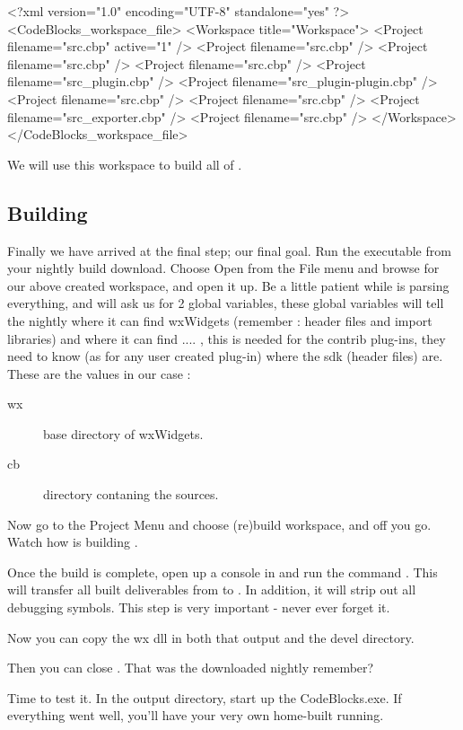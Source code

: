 \begin{code}
<?xml version="1.0" encoding="UTF-8" standalone="yes" ?>
<CodeBlocks_workspace_file>
 <Workspace title="Workspace">
   <Project filename="src\CodeBlocks.cbp" active="1" />
   <Project filename="src\plugins\contrib\codestat\codestat.cbp" />
   <Project filename="src\plugins\contrib\copystrings\copystrings.cbp" />
   <Project filename="src\plugins\contrib\dragscroll\dragscroll.cbp" />
   <Project filename="src\plugins\contrib\devpak_plugin\DevPakPlugin.cbp" />
   <Project filename="src\plugins\contrib\help_plugin\help-plugin.cbp" />
   <Project filename="src\plugins\contrib\keybinder\keybinder.cbp" />
   <Project filename="src\plugins\contrib\profiler\cbprofiler.cbp" />
   <Project filename="src\plugins\contrib\source_exporter\Exporter.cbp" />
   <Project filename="src\plugins\contrib\wxSmith\wxSmith.cbp" />
 </Workspace>
</CodeBlocks_workspace_file>
\end{code}

We will use this workspace to build all of \codeblocks.

\subsection{Building \codeblocks}

Finally we have arrived at the final step; our final goal. Run the \codeblocks executable from your nightly build download. Choose Open from the File menu and browse for our above created workspace, and open it up. Be a little patient while \codeblocks is parsing everything, and \codeblocks will ask us for 2 global variables, these global variables will tell the nightly \codeblocks where it can find wxWidgets (remember : header files and import libraries) and where it can find .... \codeblocks, this is needed for the contrib plug-ins, they need to know (as for any user created plug-in) where the sdk (\codeblocks header files) are. These are the values in our case :

\begin{description}
\item[wx]  base directory of wxWidgets.
\item[cb]  \codeblocks directory contaning the sources.
\end{description}

Now go to the Project Menu and choose (re)build workspace, and off you go. Watch how \codeblocks is building \codeblocks.

Once the build is complete, open up a console in  and run the command . This will transfer all built deliverables from  to . In addition, it will strip out all debugging symbols. This step is very important - never ever forget it.

Now you can copy the wx dll in both that output and the devel directory.

Then you can close \codeblocks. That was the downloaded nightly remember?

Time to test it. In the output directory, start up the CodeBlocks.exe. If everything went well, you'll have your very own home-built \codeblocks running.

